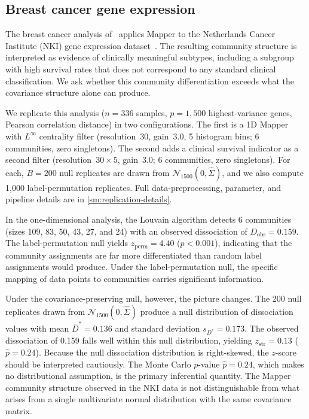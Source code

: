 \documentclass[hidelinks]{siamart251216}
\begin{document}
\subsection{Breast cancer gene expression}\label{sec:res-nki}

The breast cancer analysis of~\cite{Lum2013} applies Mapper to the
Netherlands Cancer Institute (NKI) gene expression
dataset~\citep{vanDeVijver2002}.  The resulting community structure
is interpreted as evidence of clinically meaningful subtypes, including a
subgroup with high survival rates that does not correspond to any
standard clinical classification.  We ask whether this community
differentiation exceeds what the covariance structure alone can produce.

We replicate this analysis ($n = 336$ samples, $p = 1{,}500$
highest-variance genes, Pearson correlation distance) in two
configurations.  The first is a 1D Mapper with $L^\infty$ centrality filter
(resolution~30, gain~3.0, 5 histogram bins; 6 communities, zero
singletons).  The second adds a clinical survival indicator as
a second filter (resolution~$30 \times 5$, gain~3.0; 6 communities,
zero singletons).  For each, $B = 200$ null replicates are drawn from
$\mathcal{N}_{1500}(0, \hat{\Sigma})$, and we also compute 1,000
label-permutation replicates.  Full data-preprocessing, parameter, and
pipeline details are in \cref{sm:replication-details}.

In the one-dimensional analysis,
the Louvain algorithm detects 6 communities (sizes 109, 83, 50, 43, 27,
and 24) with an observed dissociation of $D_{\mathrm{obs}} = 0.159$.
The label-permutation null yields $z_{\mathrm{perm}} = 4.40$
($p < 0.001$), indicating that the community assignments are far more
differentiated than random label assignments would produce. Under the
label-permutation null, the specific mapping of data points to
communities carries significant information.

Under the covariance-preserving null, however, the picture changes.
The 200 null replicates drawn from $\mathcal{N}_{1500}(0,
\hat{\Sigma})$ produce a null distribution of dissociation values with
mean $\bar{D}^* = 0.136$ and standard deviation $s_{D^*} = 0.173$.
The observed dissociation of 0.159 falls well within this null
distribution, yielding $z_{\mathrm{str}} = 0.13$
($\hat{p} = 0.24$).  Because the null dissociation distribution is
right-skewed, the $z$-score should be interpreted cautiously.  The Monte Carlo $p$-value
$\hat{p} = 0.24$, which makes no distributional assumption, is the
primary inferential quantity.  The Mapper community structure observed
in the NKI data is not distinguishable from what arises from a single
multivariate normal distribution with the same covariance matrix.
\end{document}

